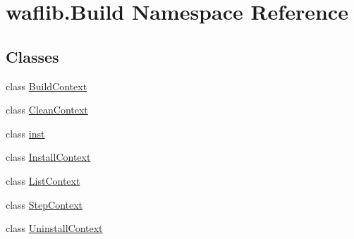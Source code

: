 \hypertarget{namespacewaflib_1_1_build}{}\section{waflib.\+Build Namespace Reference}
\label{namespacewaflib_1_1_build}
\subsection*{Classes}
\begin{DoxyCompactItemize}
\item 
class \hyperlink{classwaflib_1_1_build_1_1_build_context}{Build\+Context}
\item 
class \hyperlink{classwaflib_1_1_build_1_1_clean_context}{Clean\+Context}
\item 
class \hyperlink{classwaflib_1_1_build_1_1inst}{inst}
\item 
class \hyperlink{classwaflib_1_1_build_1_1_install_context}{Install\+Context}
\item 
class \hyperlink{classwaflib_1_1_build_1_1_list_context}{List\+Context}
\item 
class \hyperlink{classwaflib_1_1_build_1_1_step_context}{Step\+Context}
\item 
class \hyperlink{classwaflib_1_1_build_1_1_uninstall_context}{Uninstall\+Context}
\end{DoxyCompactItemize}
